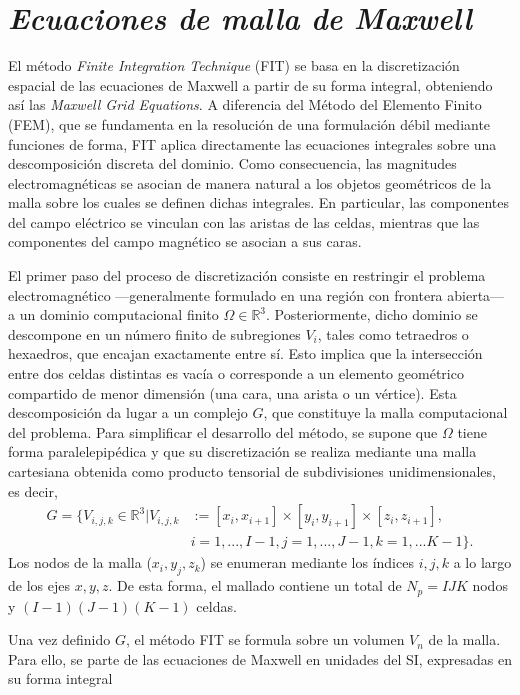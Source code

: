 
\section{\textit{Ecuaciones de malla de Maxwell}}
\label{section:MGE}

El método \textit{Finite Integration Technique} (FIT) se basa en la discretización espacial de las ecuaciones de Maxwell a partir de su forma integral, obteniendo así las \textit{Maxwell Grid Equations}. A diferencia del Método del Elemento Finito (FEM), que se fundamenta en la  resolución de una formulación débil mediante funciones de forma, FIT aplica directamente las ecuaciones integrales sobre una descomposición discreta del dominio. Como consecuencia, las magnitudes electromagnéticas se asocian de manera natural a los objetos geométricos de la malla sobre los cuales se definen dichas integrales. En particular, las componentes del campo eléctrico se vinculan con las aristas de las celdas, mientras que las componentes del campo magnético se asocian a sus caras.

El primer paso del proceso de discretización consiste en restringir el problema electromagnético —generalmente formulado en una región con frontera abierta— a un dominio computacional finito $\Omega\in\mathbb{R}^3$. Posteriormente, dicho dominio se descompone en un número finito de subregiones $V_i$, tales como tetraedros o hexaedros, que encajan exactamente entre sí. Esto implica que la intersección entre dos celdas distintas  es vacía o corresponde a un elemento geométrico compartido de menor dimensión (una cara, una arista o un vértice). Esta descomposición da lugar a un complejo $G$, que constituye la malla computacional del problema. Para simplificar el desarrollo del método, se supone que $\Omega$ tiene forma paralelepipédica y que su discretización se realiza mediante una malla cartesiana obtenida como producto tensorial de subdivisiones unidimensionales, es decir,
%
\begin{align}
	G=\{V_{i,j,k}\in \mathbb{R}^3 | V_{i,j,k}&:=[x_i,x_{i+1}]\times[y_i,y_{i+1}]\times[z_i,z_{i+1}],\nonumber\\
	&i=1,...,I-1,j=1,...,J-1,k=1,...K-1\}.
\end{align}
%
Los nodos de la malla ($x_i,y_j,z_k$) se enumeran mediante los índices $i,j,k$ a lo largo de los ejes $x,y,z$. De esta forma, el mallado contiene un total de $N_p=IJK$ nodos y $(I-1)(J-1)(K-1)$ celdas.

Una vez definido $G$, el método FIT se formula sobre un volumen $V_n$ de la malla. Para ello, se parte de las ecuaciones de Maxwell en unidades del SI, expresadas en su forma integral \cite{griffithsIntroductionElectrodynamics2023b}

